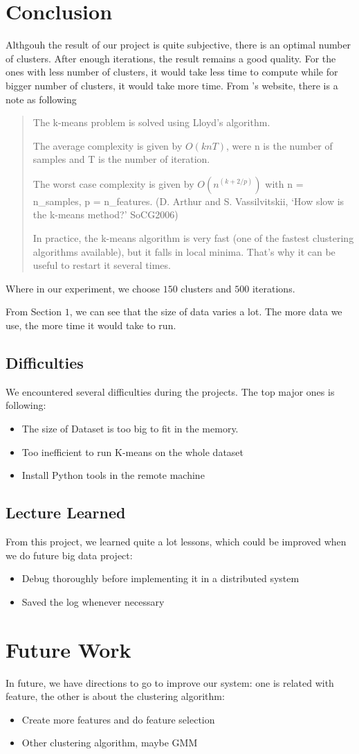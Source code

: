 \section{Conclusion}

Althgouh the result of our project is quite subjective, there is an optimal number of clusters. After enough iterations, the result remains a good quality. For the ones with less number of clusters, it would take less time to compute while for bigger number of clusters, it would take more time. From \cite{sklearn}'s website, there is a note as following
\begin{quote}
The k-means problem is solved using Lloyd’s algorithm.

The average complexity is given by $O(k n T)$, were n is the number of samples and T is the number of iteration.

The worst case complexity is given by $O(n^{(k+2/p)})$ with n = n\_samples, p = n\_features. (D. Arthur and S. Vassilvitskii, `How slow is the k-means method?' SoCG2006)

In practice, the k-means algorithm is very fast (one of the fastest clustering algorithms available), but it falls in local minima. That’s why it can be useful to restart it several times.
\end{quote}
Where in our experiment, we choose $150$ clusters and $500$ iterations.

From Section $1$, we can see that the size of data varies a lot. The more data we use, the more time it would take to run. 

\subsection{Difficulties}
We encountered several difficulties during the projects. The top major ones is following:
\begin{itemize}
    \item The size of Dataset is too big to fit in the memory.
    \item Too inefficient to run K-means on the whole dataset
    \item Install Python tools in the remote machine
\end{itemize}

\subsection{Lecture Learned}
From this project, we learned quite a lot lessons, which could be improved when we do future big data project:
\begin{itemize}
    \item Debug thoroughly before implementing it in a distributed system
    \item Saved the log whenever necessary
\end{itemize}

\section{Future Work}
In future, we have directions to go to improve our system: one is related with feature, the other is about the clustering algorithm:
\begin{itemize}
    \item Create more features and do feature selection
    \item Other clustering algorithm, maybe GMM 
\end{itemize}

